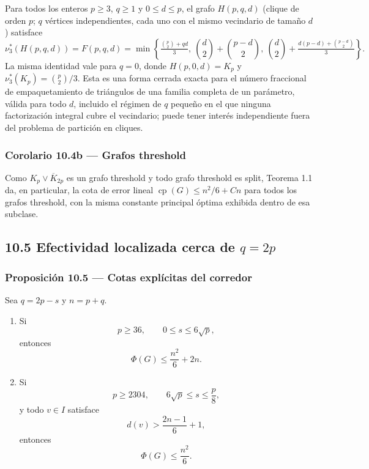 \documentclass[
  11pt,
]{article}
\begin{document}
Para todos los enteros \(p\ge3\), \(q\ge1\) y \(0\le d\le p\), el grafo \(H(p,q,d)\)
(clique de orden \(p\); \(q\) vértices independientes, cada uno con el mismo vecindario de tamaño
\(d\)) satisface
\[
\nu_3^*(H(p,q,d))=F(p,q,d)=\min\left\{\tfrac{\binom p2+qd}{3},\ \binom d2+\binom{p-d}2,\ \binom d2+\tfrac{d(p-d)+\binom{p-d}2}{3}\right\}.
\]
La misma identidad vale para \(q=0\), donde \(H(p,0,d)=K_p\) y \(\nu_3^*(K_p)=\binom p2/3\). Esta es una forma cerrada exacta para el número fraccional de empaquetamiento de triángulos de una familia completa de un parámetro, válida para todo \(d\), incluido el régimen de \(q\) pequeño en el que ninguna factorización integral cubre el vecindario; puede tener interés independiente fuera del problema de partición en cliques.

\subsubsection{Corolario 10.4b --- Grafos threshold}\label{corolario-10.4b-grafos-threshold}

Como \(K_p\vee\overline K_{2p}\) es un grafo threshold y todo grafo threshold es split,
Teorema 1.1 da, en particular, la cota de error lineal \(\operatorname{cp}(G)\le n^2/6+Cn\)
para todos los grafos threshold, con la misma constante principal óptima exhibida dentro de esa subclase.

\subsection{\texorpdfstring{10.5 Efectividad localizada cerca de \(q=2p\)}{10.5 Efectividad localizada cerca de q=2p}}\label{efectividad-localizada-cerca-de-q2p}

\subsubsection{Proposición 10.5 --- Cotas explícitas del corredor}\label{proposiciuxf3n-10.5-cotas-expluxedcitas-del-corredor}

Sea \(q=2p-s\) y \(n=p+q\).

\begin{enumerate}
\def\labelenumi{\arabic{enumi}.}
\item
  Si
  \[
  p\ge36,
  \qquad
  0\le s\le6\sqrt p,
  \]
  entonces
  \[
  \boxed{
  \Phi(G)\le\frac{n^2}{6}+2n.
  }
  \tag{10.2}
  \]
\item
  Si
  \[
  p\ge2304,
  \qquad
  6\sqrt p\le s\le\frac p8,
  \]
  y todo \(v\in I\) satisface
  \[
  d(v)>\frac{2n-1}{6}+1,
  \]
  entonces
  \[
  \boxed{
  \Phi(G)\le\frac{n^2}{6}.
  }
  \tag{10.3}
  \]
\end{enumerate}
\end{document}
